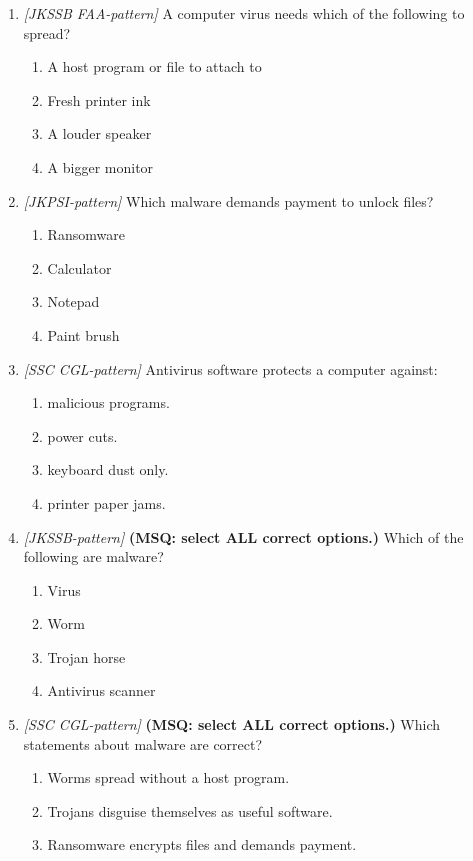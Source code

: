 \begin{enumerate}[label=\textbf{Q\arabic*.}, leftmargin=*]
\item \textit{[JKSSB FAA-pattern]} A computer virus needs which of the following to spread?
  \begin{enumerate}[label=\Alph*.]
    \item A host program or file to attach to
    \item Fresh printer ink
    \item A louder speaker
    \item A bigger monitor
  \end{enumerate}
\item \textit{[JKPSI-pattern]} Which malware demands payment to unlock files?
  \begin{enumerate}[label=\Alph*.]
    \item Ransomware
    \item Calculator
    \item Notepad
    \item Paint brush
  \end{enumerate}
\item \textit{[SSC CGL-pattern]} Antivirus software protects a computer against:
  \begin{enumerate}[label=\Alph*.]
    \item malicious programs.
    \item power cuts.
    \item keyboard dust only.
    \item printer paper jams.
  \end{enumerate}
\item \textit{[JKSSB-pattern]} \textbf{(MSQ: select ALL correct options.)} Which of the following are malware?
  \begin{enumerate}[label=\Alph*.]
    \item Virus
    \item Worm
    \item Trojan horse
    \item Antivirus scanner
  \end{enumerate}
\item \textit{[SSC CGL-pattern]} \textbf{(MSQ: select ALL correct options.)} Which statements about malware are correct?
  \begin{enumerate}[label=\Alph*.]
    \item Worms spread without a host program.
    \item Trojans disguise themselves as useful software.
    \item Ransomware encrypts files and demands payment.

\end{enumerate}
\end{enumerate}
